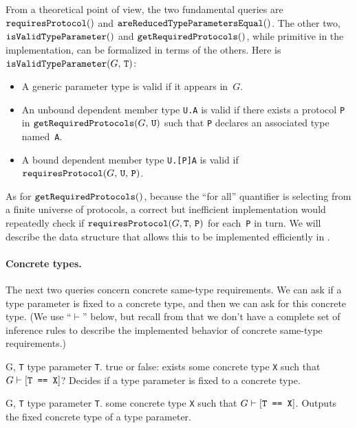 \documentclass[../generics]{subfiles}
\begin{document}
From a theoretical point of view, the two fundamental queries are $\texttt{requiresProtocol}()$ and $\texttt{areReducedTypeParametersEqual}()$. The other two, $\texttt{isValidTypeParameter}()$ and $\texttt{getRequiredProtocols}()$, while primitive in the implementation, can be formalized in terms of the others. Here is $\texttt{isValidTypeParameter}(G,\,\texttt{T})$:
\begin{itemize}
\item A generic parameter type is valid if it appears in~$G$.
\item An unbound dependent member type \texttt{U.A} is valid if there exists a protocol \texttt{P} in $\texttt{getRequiredProtocols}(G,\,\texttt{U})$
such that \texttt{P} declares an associated type named~\texttt{A}.
\item A bound dependent member type \texttt{U.[P]A} is valid if $\texttt{requiresProtocol}(G,\,\texttt{U},\,\texttt{P})$.
\end{itemize}
As for $\texttt{getRequiredProtocols}()$, because the ``for all'' quantifier is selecting from a finite universe of protocols, a correct but inefficient implementation would repeatedly check if $\texttt{requiresProtocol}(G,\texttt{T},\,\texttt{P})$ for each~\texttt{P} in turn. We will describe the data structure that allows this to be implemented efficiently in .

\paragraph{Concrete types.} The next two queries concern concrete same-type requirements. We can ask if a type parameter is fixed to a concrete type, and then we can ask for this concrete type. (We use ``$\vdash$'' below, but recall from  that we don't have a complete set of inference rules to describe the implemented behavior of concrete same-type requirements.)

\begin{itemize}
{G, \texttt{T}}
{type parameter \texttt{T}.}
{true or false: exists some concrete type \texttt{X} such that $G\vdash[\texttt{T == X}]$?}
{Decides if a type parameter is fixed to a concrete type.}

{G, \texttt{T}}
{type parameter \texttt{T}.}
{some concrete type \texttt{X} such that $G\vdash[\texttt{T == X}]$.}
{Outputs the fixed concrete type of a type parameter.}
\end{itemize}
\end{document}
